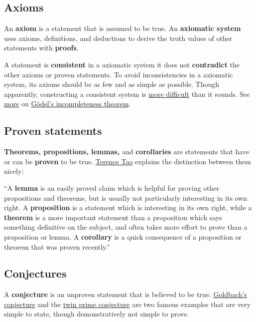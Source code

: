 \documentclass{article}[12pt]
\begin{document}
    \subsection{Axioms}
    
        An \textbf{axiom} is a statement that is assumed to be true. An \textbf{axiomatic system} uses axioms, definitions, and deductions to derive the truth values of other statements with \textbf{proofs}.
        
        A statement is \textbf{consistent} in a axiomatic system it does not \textbf{contradict} the other axioms or proven statements. To avoid inconsistencies in a axiomatic system, its axioms should be as few and as simple as possible. Though apparently, constructing a consistent system is \href{https://youtu.be/2YIKpHxitNk?t=192}{more difficult} than it sounds.\cite{rayo-mit} See \href{https://www.youtube.com/watch?v=I4pQbo5MQOs}{more} on \href{https://www.youtube.com/watch?v=O4ndIDcDSGc}{Gödel's incompleteness theorem}.

    \subsection{Proven statements}
    
        \textbf{Theorems, propositions, lemmas,} and \textbf{corollaries} are statements that have or can be \textbf{proven} to be true. \href{https://youtu.be/MXJ-zpJeY3E}{Terence Tao} explains the distinction between them nicely:
        \begin{displayquote}
            ``A \textbf{lemma} is an easily proved claim which is helpful for proving other propositions and theorems, but is usually not particularly interesting in its own right. A \textbf{proposition} is a statement which is interesting in its own right, while a \textbf{theorem} is a more important statement than a proposition which says something definitive on the subject, and often takes more effort to prove than a proposition or lemma. A \textbf{corollary} is a quick consequence of a proposition or theorem that was proven recently.''\cite{tao-book}
        \end{displayquote}
        
    \subsection{Conjectures}
    
        A \textbf{conjecture} is an unproven statement that is believed to be true. \href{https://youtu.be/MxiTG96QOxw}{Goldbach's conjecture} and the \href{https://youtu.be/QKHKD8bRAro}{twin prime conjecture} are two famous examples that are very simple to state, though demonstratively not simple to prove.
        
\end{document}

